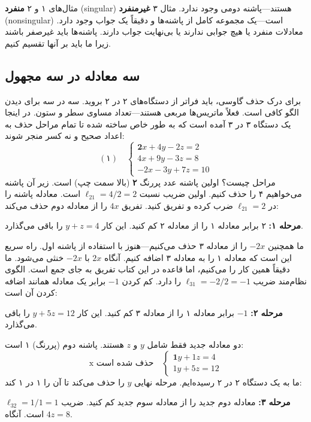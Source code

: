 \documentclass[12pt, a4paper]{book}
\theoremstyle{translator}
\begin{document}
	مثال‌های ۱ و ۲ \textbf{منفرد} (singular) هستند—پاشنه دومی وجود ندارد. مثال ۳ \textbf{غیرمنفرد} (nonsingular) است—یک مجموعه کامل از پاشنه‌ها و دقیقاً یک جواب وجود دارد. معادلات منفرد یا هیچ جوابی ندارند یا بی‌نهایت جواب دارند. پاشنه‌ها باید غیرصفر باشند زیرا ما باید بر آنها تقسیم کنیم.
	
	\subsection*{سه معادله در سه مجهول}
	برای درک حذف گاوسی، باید فراتر از دستگاه‌های ۲ در ۲ بروید. سه در سه برای دیدن الگو کافی است. فعلاً ماتریس‌ها مربعی هستند—تعداد مساوی سطر و ستون. در اینجا یک دستگاه ۳ در ۳ آمده است که به طور خاص ساخته شده تا تمام مراحل حذف به اعداد صحیح و نه کسر منجر شوند:
	\[
	(۱) \quad
	\begin{cases}
		\mathbf{2}x + 4y - 2z = 2 \\
		4x + 9y - 3z = 8 \\
		-2x - 3y + 7z = 10
	\end{cases}
	\]
	مراحل چیست؟ اولین پاشنه عدد پررنگ \textbf{۲} (بالا سمت چپ) است. زیر آن پاشنه می‌خواهیم ۴ را حذف کنیم. اولین ضریب نسبت $\ell_{21} = 4/2 = 2$ است. معادله پاشنه را در $\ell_{21} = 2$ ضرب کرده و تفریق کنید. تفریق $4x$ را از معادله دوم حذف می‌کند:
	
	\textbf{مرحله ۱:} ۲ برابر معادله ۱ را از معادله ۲ کم کنید. این کار $y+z=4$ را باقی می‌گذارد.
	
	ما همچنین $-2x$ را از معادله ۳ حذف می‌کنیم—هنوز با استفاده از پاشنه اول. راه سریع این است که معادله ۱ را به معادله ۳ اضافه کنیم. آنگاه $2x$ با $-2x$ خنثی می‌شود. ما دقیقاً همین کار را می‌کنیم، اما قاعده در این کتاب تفریق به جای جمع است. الگوی نظام‌مند ضریب $\ell_{31} = -2/2 = -1$ را دارد. کم کردن $-1$ برابر یک معادله همانند اضافه کردن آن است:
	
	\textbf{مرحله ۲:} $-1$ برابر معادله ۱ را از معادله ۳ کم کنید. این کار $y+5z=12$ را باقی می‌گذارد.
	
	دو معادله جدید فقط شامل $y$ و $z$ هستند. پاشنه دوم (پررنگ) ۱ است:
	\[
	\text{x حذف شده است}
	\quad
	\begin{cases}
		\mathbf{1}y + 1z = 4 \\
		1y + 5z = 12
	\end{cases}
	\]
	ما به یک دستگاه ۲ در ۲ رسیده‌ایم. مرحله نهایی $y$ را حذف می‌کند تا آن را ۱ در ۱ کند:
	
	\textbf{مرحله ۳:} معادله دوم جدید را از معادله سوم جدید کم کنید. ضریب $\ell_{32} = 1/1 = 1$ است. آنگاه $4z=8$.
	
\end{document}
